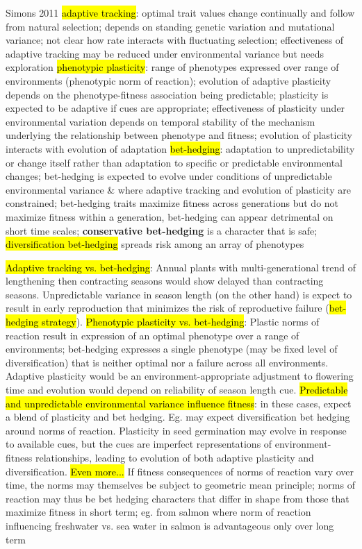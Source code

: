 \documentclass[12pt, oneside, titlepage]{article}   	%
\begin{document}
Simons 2011
\hl{adaptive tracking}: optimal trait values change continually and follow from natural selection; depends on standing genetic variation and mutational variance; not clear how rate interacts with fluctuating selection; effectiveness of adaptive tracking may be reduced under environmental variance but needs exploration
\hl{phenotypic plasticity}: range of phenotypes expressed over range of environments (phenotypic norm of reaction); evolution of adaptive plasticity depends on the phenotype-fitness association being predictable; plasticity is expected to be adaptive if cues are appropriate; effectiveness of plasticity under environmental variation depends on temporal stability of the mechanism underlying the relationship between phenotype and fitness; evolution of plasticity interacts with evolution of adaptation
\hl{bet-hedging}: adaptation to unpredictability or change itself rather than adaptation to specific or predictable environmental changes; bet-hedging is expected to evolve under conditions of unpredictable environmental variance \& where adaptive tracking and evolution of plasticity are constrained; bet-hedging traits maximize fitness across generations but do not maximize fitness within a generation, bet-hedging can appear detrimental on short time scales; \textbf{conservative bet-hedging} is a character that is safe; \hl{diversification bet-hedging} spreads risk among an array of phenotypes

\hl{Adaptive tracking vs. bet-hedging}: Annual plants with multi-generational trend of lengthening then contracting seasons would show delayed than contracting seasons. Unpredictable variance in season length (on the other hand) is expect to result in early reproduction that minimizes the risk of reproductive failure (\hl{bet-hedging strategy}).
\hl{Phenotypic plasticity vs. bet-hedging}: Plastic norms of reaction result in expression of an optimal phenotype over a range of environments; bet-hedging expresses a single phenotype (may be fixed level of diversification) that is neither optimal nor a failure across all environments. Adaptive plasticity would be an environment-appropriate adjustment to flowering time and evolution would depend on reliability of season length cue.
\hl{Predictable and unpredictable environmental variance influence fitness}: in these cases, expect a blend of plasticity and bet hedging. Eg. may expect diversification bet hedging around norms of reaction. Plasticity in seed germination may evolve in response to available cues, but the cues are imperfect representations of environment-fitness relationships, leading to evolution of both adaptive plasticity and diversification.
\hl{Even more...} If fitness consequences of norms of reaction vary over time, the norms may themselves be subject to geometric mean principle; norms of reaction may thus be bet hedging characters that differ in shape from those that maximize fitness in short term; eg. from salmon where norm of reaction influencing freshwater vs. sea water in salmon is advantageous only over long term
\end{document}
